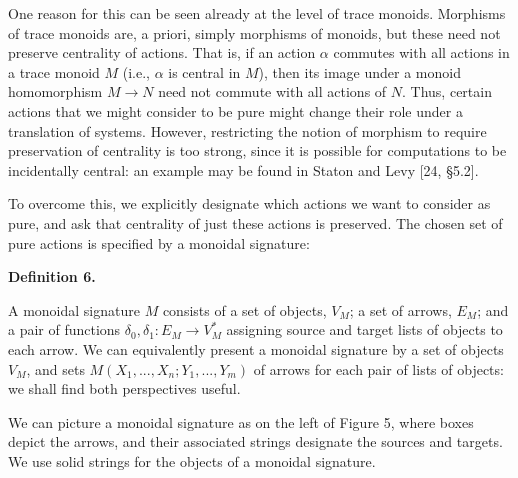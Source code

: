  
 
One reason for this can be seen already at the level of trace monoids. Morphisms of trace monoids are, a priori, simply morphisms of monoids, but these need not preserve centrality of actions. That is, if an action $\alpha$ commutes with all actions in a trace monoid $M$ (i.e., $\alpha$ is central in $M$), then its image under a monoid homomorphism $M\to N$ need not commute with all actions of $N$. Thus, certain actions that we might consider to be pure might change their role under a translation of systems. However, restricting the notion of morphism to require preservation of centrality is too strong, since it is possible for computations to be incidentally central: an example may be found in Staton and Levy [24, §5.2].\par
 
 
 
To overcome this, we explicitly designate which actions we want to consider as pure, and ask that centrality of just these actions is preserved. The chosen set of pure actions is specified by a monoidal signature:\par
 
 
 
\par\medskip\noindent\textbf{Definition 6.}\par
 
 
A monoidal signature $M$ consists of a set of objects, $V_{M}$; a set of arrows, $E_{M}$; and a pair of functions $\delta_{0},\delta_{1}:E_{M}\to V_{M}^{*}$ assigning source and target lists of objects to each arrow. We can equivalently present a monoidal signature by a set of objects $V_{M}$, and sets $M(X_{1},...,X_{n};Y_{1},...,Y_{m})$ of arrows for each pair of lists of objects: we shall find both perspectives useful.\par
 
 
 
 
We can picture a monoidal signature as on the left of Figure 5, where boxes depict the arrows, and their associated strings designate the sources and targets. We use solid strings for the objects of a monoidal signature.\par
 
